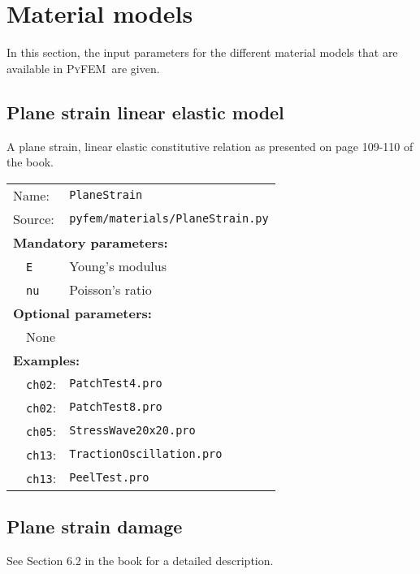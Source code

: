 \documentclass{article}
\newcommand{\progname}{\textsc{PyFEM}}
\begin{document}
\section{Material models}\label{sec:matmodel}

In this section, the input parameters for the different material models that are available in
\progname~are given.

\subsection{Plane strain linear elastic model}

A plane strain, linear elastic constitutive relation as presented on page 109-110 of the book.\\

\begin{tabular}{p{22mm}p{74mm}}
Name:         & \texttt{PlaneStrain} \\
Source:  & \texttt{pyfem/materials/PlaneStrain.py} \\
\multicolumn{2}{l}{\textbf{Mandatory parameters:}} \\
~~\texttt{E} & Young's modulus \\
~~\texttt{nu} & Poisson's ratio \\
\multicolumn{2}{l}{\textbf{Optional parameters:}} \\ 
~~None  & \\
\multicolumn{2}{l}{\textbf{Examples:}}\\
~~\texttt{ch02}: & \texttt{PatchTest4.pro}\\
~~\texttt{ch02}: & \texttt{PatchTest8.pro}\\
~~\texttt{ch05}: & \texttt{StressWave20x20.pro}\\
~~\texttt{ch13}: & \texttt{TractionOscillation.pro}\\
~~\texttt{ch13}: & \texttt{PeelTest.pro}
\end{tabular}

\subsection{Plane strain damage}

See Section 6.2 in the book for a detailed description.\\
\end{document}
